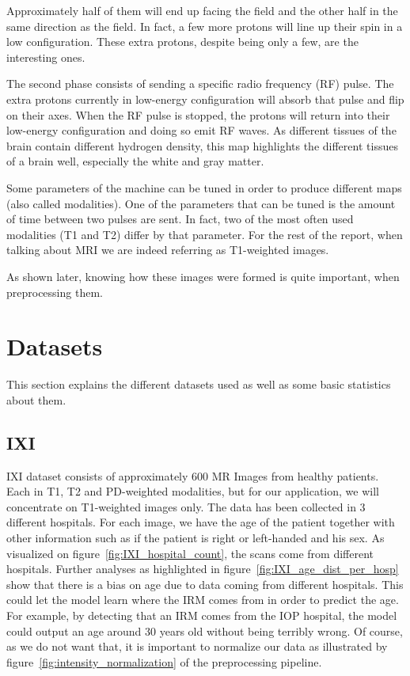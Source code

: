 Approximately half of them will end up facing the field and the other half in the same direction as the field. In fact, a few more protons will line up their spin in a low configuration. These extra protons, despite being only a few, are the interesting ones.

The second phase consists of sending a specific radio frequency (RF) pulse. The extra protons currently in low-energy configuration will absorb that pulse and flip on their axes. When the RF pulse is stopped, the protons will return into their low-energy configuration and doing so emit RF waves. As different tissues of the brain contain different hydrogen density, this map highlights the different tissues of a brain well, especially the white and gray matter.

Some parameters of the machine can be tuned in order to produce different maps (also called modalities). One of the parameters that can be tuned is the amount of time between two pulses are sent. In fact, two of the most often used modalities (T1 and T2) differ by that parameter. For the rest of the report, when talking about MRI we are indeed referring as T1-weighted images.

As shown later, knowing how these images were formed is quite important, when preprocessing them.

\section{Datasets}
This section explains the different datasets used as well as some basic statistics about them.
\subsection{IXI}
IXI dataset consists of approximately 600 MR Images from healthy patients. Each in T1, T2 and PD-weighted modalities, but for our application, we will concentrate on T1-weighted images only. The data has been collected in 3 different hospitals. For each image, we have the age of the patient together with other information such as if the patient is right or left-handed and his sex. As visualized on figure~\ref{fig:IXI_hospital_count}, the scans come from different hospitals. Further analyses as highlighted in figure~\ref{fig:IXI_age_dist_per_hosp} show that there is a bias on age due to data coming from different hospitals. This could let the model learn where the IRM comes from in order to predict the age. For example, by detecting that an IRM comes from the IOP hospital, the model could output an age around 30 years old without being terribly wrong. Of course, as we do not want that, it is important to normalize our data as illustrated by figure~\ref{fig:intensity_normalization} of the preprocessing pipeline.

